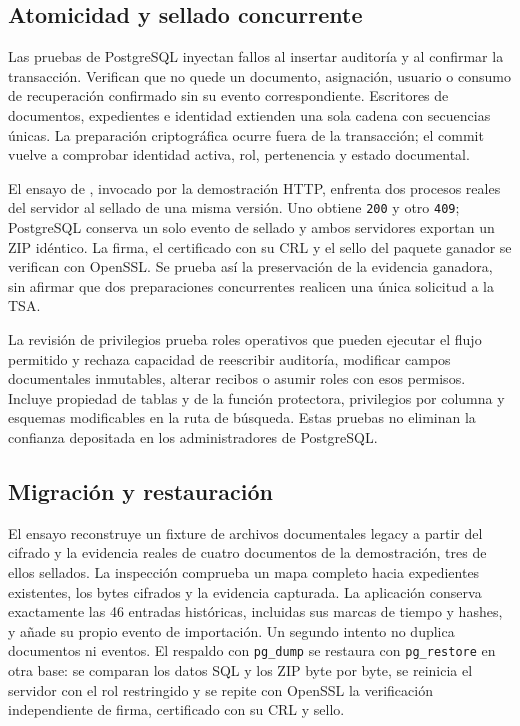 \subsection{Atomicidad y sellado concurrente}\label{sec:pruebas-atomicidad}

Las pruebas de PostgreSQL inyectan fallos al insertar auditoría y al confirmar la transacción. Verifican que no quede un documento, asignación, usuario o consumo de recuperación confirmado sin su evento correspondiente. Escritores de documentos, expedientes e identidad extienden una sola cadena con secuencias únicas. La preparación criptográfica ocurre fuera de la transacción; el commit vuelve a comprobar identidad activa, rol, pertenencia y estado documental.

El ensayo de , invocado por la demostración HTTP, enfrenta dos procesos reales del servidor al sellado de una misma versión. Uno obtiene \texttt{200} y otro \texttt{409}; PostgreSQL conserva un solo evento de sellado y ambos servidores exportan un ZIP idéntico. La firma, el certificado con su CRL y el sello del paquete ganador se verifican con OpenSSL. Se prueba así la preservación de la evidencia ganadora, sin afirmar que dos preparaciones concurrentes realicen una única solicitud a la TSA.

La revisión de privilegios prueba roles operativos que pueden ejecutar el flujo permitido y rechaza capacidad de reescribir auditoría, modificar campos documentales inmutables, alterar recibos o asumir roles con esos permisos. Incluye propiedad de tablas y de la función protectora, privilegios por columna y esquemas modificables en la ruta de búsqueda. Estas pruebas no eliminan la confianza depositada en los administradores de PostgreSQL.

\subsection{Migración y restauración}\label{sec:pruebas-migracion}

El ensayo  reconstruye un fixture de archivos documentales legacy a partir del cifrado y la evidencia reales de cuatro documentos de la demostración, tres de ellos sellados. La inspección comprueba un mapa completo hacia expedientes existentes, los bytes cifrados y la evidencia capturada. La aplicación conserva exactamente las 46 entradas históricas, incluidas sus marcas de tiempo y hashes, y añade su propio evento de importación. Un segundo intento no duplica documentos ni eventos. El respaldo con \texttt{pg\_dump} se restaura con \texttt{pg\_restore} en otra base: se comparan los datos SQL y los ZIP byte por byte, se reinicia el servidor con el rol restringido y se repite con OpenSSL la verificación independiente de firma, certificado con su CRL y sello.

